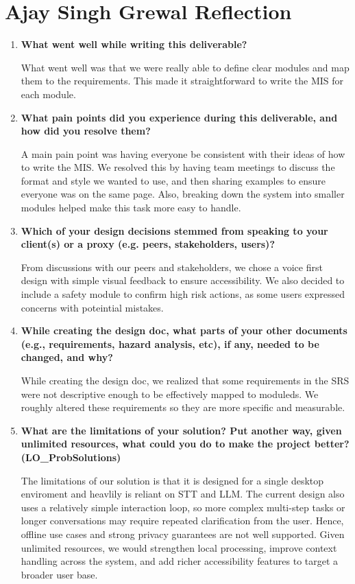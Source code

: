 \documentclass[12pt, titlepage]{article}
\begin{document}
\section*{Ajay Singh Grewal Reflection}

\begin{enumerate}

\item \textbf{What went well while writing this deliverable?}

What went well was that we were really able to define clear modules and map them
to the requirements. This made it straightforward to write the MIS for each
module.

\item \textbf{What pain points did you experience during this deliverable,
and how did you resolve them?}

A main pain point was having everyone be consistent with their ideas of how to
write the MIS. We resolved this by having team meetings to discuss the format
and style we wanted to use, and then sharing examples to ensure everyone was
on the same page. Also, breaking down the system into smaller modules helped
make this task more easy to handle.

\item \textbf{Which of your design decisions stemmed from speaking to your
client(s) or a proxy (e.g. peers, stakeholders, users)?}

From discussions with our peers and stakeholders, we chose a voice first design
with simple visual feedback to ensure accessibility. We also decided to include a
safety module to confirm high risk actions, as some users expressed concerns
with poteintial mistakes.

\item \textbf{While creating the design doc, what parts of your other
documents (e.g., requirements, hazard analysis, etc), if any, needed
to be changed, and why?}

While creating the design doc, we realized that some requirements in the SRS
were not descriptive enough to be effectively mapped to moduleds. We roughly
altered these requirements so they are more specific and measurable.

\item \textbf{What are the limitations of your solution? Put another way,
given unlimited resources, what could you do to make the project
better? (LO\_ProbSolutions)}

The limitations of our solution is that it is designed for a single desktop
enviroment and heavlily is reliant on STT and LLM. The current design also uses
a relatively simple interaction loop, so more complex multi-step tasks or longer
conversations may require repeated clarification from the user. Hence, offline use cases
and strong privacy guarantees are not well supported. Given unlimited resources,
we would strengthen local processing, improve context handling across the system,
and add richer accessibility features to target a broader user base.


\end{enumerate}
\end{document}
